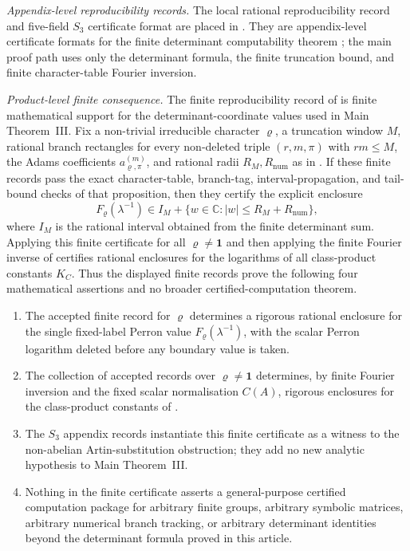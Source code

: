 \documentclass[11pt,a4paper]{amsart}
\theoremstyle{plain}
\theoremstyle{definition}
\theoremstyle{remark}
\newcommand{\CC}{\mathbb{C}}
\begin{document}
\medskip
\noindent\textit{Appendix-level reproducibility records.}
  The local rational reproducibility record and five-field \(S_3\) certificate format are
  placed in .
  They are appendix-level certificate formats for the finite determinant
  computability theorem ; the
  main proof path uses only the determinant formula, the finite truncation
  bound, and finite character-table Fourier inversion.

\medskip
\noindent\textit{Product-level finite consequence.}
  The finite reproducibility record of
  is finite mathematical support for the determinant-coordinate values
  used in Main Theorem~III.  Fix a non-trivial irreducible character
  \(\varrho\), a truncation window \(M\), rational branch rectangles for every
  non-deleted triple \((r,m,\pi)\) with \(rm\le M\), the Adams coefficients
  \(a_{\varrho,\pi}^{(m)}\), and rational radii \(R_M,R_{\mathrm{num}}\) as in
  .  If these finite records pass
  the exact character-table, branch-tag, interval-propagation, and tail-bound
  checks of that proposition, then they certify the explicit enclosure
  \[
    F_\varrho(\lambda^{-1})
    \in
    I_M+
    \{w\in\CC:|w|\le R_M+R_{\mathrm{num}}\},
  \]
  where \(I_M\) is the rational interval obtained from the finite determinant
  sum.  Applying this finite certificate for all
  \(\varrho\ne\mathbf1\) and then applying the finite Fourier inverse of
   certifies rational enclosures for
  the logarithms of all class-product constants \(K_C\).  Thus the displayed
  finite records prove the following four mathematical assertions and no
  broader certified-computation theorem.
  \begin{enumerate}[label=\textup{(\roman*)},leftmargin=*]
    \item The accepted finite record for \(\varrho\) determines a rigorous
      rational enclosure for the single fixed-label Perron value
      \(F_\varrho(\lambda^{-1})\), with the scalar Perron logarithm deleted
      before any boundary value is taken.
    \item The collection of accepted records over
      \(\varrho\ne\mathbf1\) determines, by finite Fourier inversion and the
      fixed scalar normalisation \(C(A)\), rigorous enclosures for the
      class-product constants of .
    \item The \(S_3\) appendix records instantiate this finite certificate as a
      witness to the non-abelian Artin-substitution obstruction; they add no
      new analytic hypothesis to Main Theorem~III.
    \item Nothing in the finite certificate asserts a general-purpose certified
      computation package for arbitrary finite groups, arbitrary symbolic
      matrices, arbitrary numerical branch tracking, or arbitrary determinant
      identities beyond the determinant formula proved in this article.
  \end{enumerate}
\end{document}
